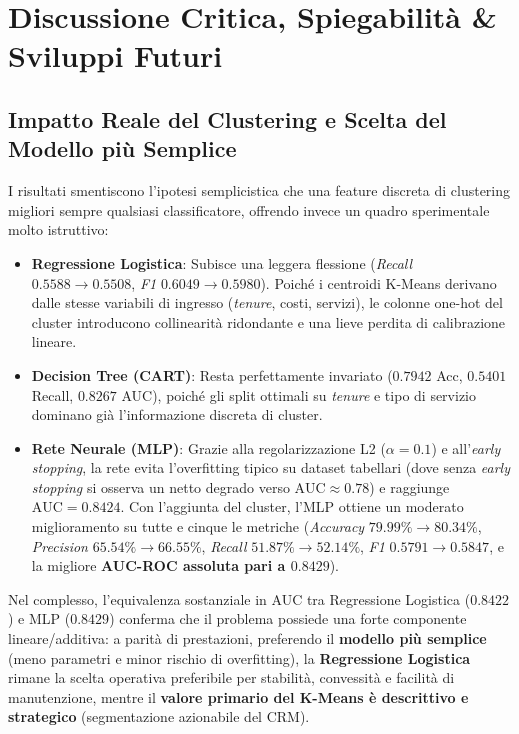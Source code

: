 \documentclass[11pt,a4paper]{article}
\begin{document}
\section{Discussione Critica, Spiegabilità \& Sviluppi Futuri}

\subsection{Impatto Reale del Clustering e Scelta del Modello più Semplice}
I risultati smentiscono l'ipotesi semplicistica che una feature discreta di clustering migliori sempre qualsiasi classificatore, offrendo invece un quadro sperimentale molto istruttivo:
\begin{itemize}
    \item \textbf{Regressione Logistica}: Subisce una leggera flessione (\textit{Recall} $0.5588 \rightarrow 0.5508$, \textit{F1} $0.6049 \rightarrow 0.5980$). Poiché i centroidi K-Means derivano dalle stesse variabili di ingresso (\textit{tenure}, costi, servizi), le colonne one-hot del cluster introducono collinearità ridondante e una lieve perdita di calibrazione lineare.
    \item \textbf{Decision Tree (CART)}: Resta perfettamente invariato ($0.7942$ Acc, $0.5401$ Recall, $0.8267$ AUC), poiché gli split ottimali su \textit{tenure} e tipo di servizio dominano già l'informazione discreta di cluster.
    \item \textbf{Rete Neurale (MLP)}: Grazie alla regolarizzazione L2 ($\alpha=0.1$) e all'\textit{early stopping}, la rete evita l'overfitting tipico su dataset tabellari (dove senza \textit{early stopping} si osserva un netto degrado verso $\text{AUC} \approx 0.78$) e raggiunge $\text{AUC} = 0.8424$. Con l'aggiunta del cluster, l'MLP ottiene un moderato miglioramento su tutte e cinque le metriche (\textit{Accuracy} $79.99\% \rightarrow 80.34\%$, \textit{Precision} $65.54\% \rightarrow 66.55\%$, \textit{Recall} $51.87\% \rightarrow 52.14\%$, \textit{F1} $0.5791 \rightarrow 0.5847$, e la migliore \textbf{AUC-ROC assoluta pari a $0.8429$}).
\end{itemize}
Nel complesso, l'equivalenza sostanziale in AUC tra Regressione Logistica ($0.8422$) e MLP ($0.8429$) conferma che il problema possiede una forte componente lineare/additiva: a parità di prestazioni, preferendo il \textbf{modello più semplice} (meno parametri e minor rischio di overfitting), la \textbf{Regressione Logistica} rimane la scelta operativa preferibile per stabilità, convessità e facilità di manutenzione, mentre il \textbf{valore primario del K-Means è descrittivo e strategico} (segmentazione azionabile del CRM).
\end{document}
